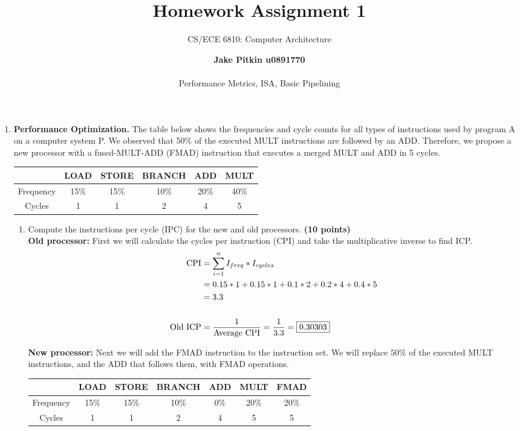 \documentclass[a4paper, 15pt]{exam}
\title{Homework Assignment 1}
\subtitle{CS/ECE 6810: Computer Architecture}
\author{
\textbf{Jake Pitkin u0891770} \\ \\
Performance Metrics, ISA, Basic Pipelining}
\begin{document}
\maketitle

\begin{enumerate}
	\item \textbf {Performance Optimization.}
   The table below shows the frequencies and cycle counts for all types of instructions used by program A on a computer system P. We observed that 50\% of the executed MULT instructions are followed by an ADD. Therefore, we propose a new processor with a fused-MULT-ADD (FMAD) instruction that executes a merged MULT and ADD in 5 cycles.


   \begin{center}
\begin{tabular}{ |c|c|c|c|c|c| } 
 \hline
  & LOAD & STORE & BRANCH & ADD & MULT \\ 
  \hline
 Frequency & 15\% & 15\% & 10\% & 20\% & 40\% \\ \hline
 Cycles & 1 & 1 & 2 &4 & 5 \\ 

\hline
\end{tabular}
\end{center}
	\begin{enumerate}
    \item Compute the instructions per cycle (IPC) for the new and old processors. \textbf{(10 points)} \\
   
   \textbf{Old processor:} First we will calculate the cycles per instruction (CPI) and take the multiplicative inverse to find ICP.  
   \begin{align*} 
   			\text{CPI} &= \sum_{i = 1}^n I_{freq} * I_{cycles} \\
   			  			&= 0.15 * 1 + 0.15 * 1 + 0.1 * 2 + 0.2 * 4 + 0.4 * 5 \\
   			  			&= 3.3 \\ \\
   			  			\text{Old ICP} &= \frac{1}{\text{Average CPI}} = \frac{1}{3.3} = \fbox{0.30303}
   	\end{align*}
   	
   	\textbf{New processor:} Next we will add the FMAD instruction to the instruction set. We will replace $50\%$ of the executed MULT instructions, and the ADD that follows them, with FMAD operations.
   	
   	   \begin{center}
\begin{tabular}{ |c|c|c|c|c|c|c| } 
 \hline
  & LOAD & STORE & BRANCH & ADD & MULT & FMAD \\ 
  \hline
 Frequency & 15\% & 15\% & 10\% & 0\% & 20\% & 20\% \\ \hline
 Cycles & 1 & 1 & 2 &4 & 5 & 5\\ 


\end{tabular}
\end{center}
\end{enumerate}
\end{enumerate}
\end{document}
